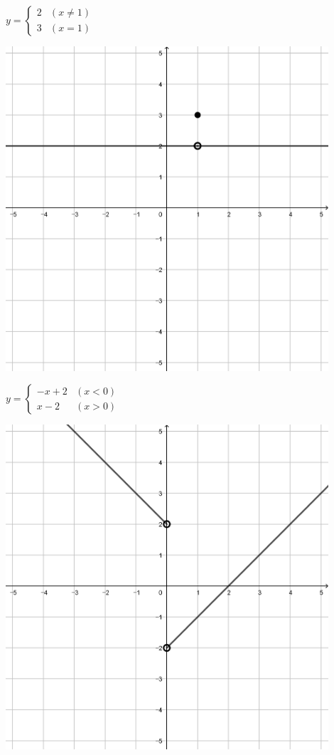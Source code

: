 \documentclass[a4paper]{oblivoir}
\begin{document}
\begin{minipage}{0.45\textwidth}\centering
\(y=\begin{cases}2&(x\neq1)\\3&(x=1)\end{cases}\)
\par\bigskip\includegraphics[width=0.9\textwidth]{img/14-3}
\end{minipage}
\begin{minipage}{0.45\textwidth}\centering
\(y=\begin{cases}-x+2&(x<0)\\x-2&(x>0)\end{cases}\)
\par\bigskip\includegraphics[width=0.9\textwidth]{img/14-4}
\end{minipage}\bigskip\bigskip\par
\end{document}
